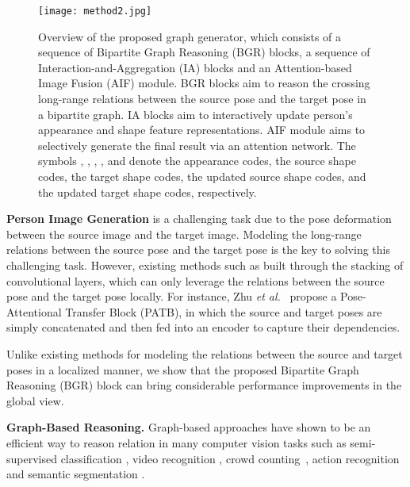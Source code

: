 \documentclass{bmvc2k}
\begin{document}
\begin{figure}[!t]
	\centering
\texttt{[image: method2.jpg]}
	\caption{Overview of the proposed graph generator, which consists of a sequence of Bipartite Graph Reasoning (BGR) blocks, a sequence of Interaction-and-Aggregation (IA) blocks and an Attention-based Image Fusion (AIF) module. BGR blocks aim to reason the crossing long-range relations between the source pose and the target pose in a bipartite graph. IA blocks aim to interactively update person's appearance and shape feature representations. AIF module aims to selectively generate the final result via an attention network.
	The symbols , , , , and  denote the appearance codes, the source shape codes, the target shape codes, the updated source shape codes, and the updated target shape codes, respectively.
	}
	\label{fig:method}
\end{figure}

\noindent \textbf{Person Image Generation} is a challenging task due to the pose deformation between the source image and the target image.
Modeling the long-range relations between the source pose and the target pose is the key to solving this challenging task.
However, existing methods such as \cite{ma2017pose,ma2018disentangled,balakrishnan2018synthesizing,siarohin2018deformable,tang2019cycle,albahar2019guided,esser2018variational,zhu2019progressive,chan2019everybody,zanfir2018human,liang2019pcgan,liu2019liquid} built through the stacking of convolutional layers, which can only leverage the relations between the source pose and the target pose locally.
For instance, Zhu \emph{et al.}~\cite{zhu2019progressive} propose a Pose-Attentional Transfer Block (PATB), in which the source and target poses are simply concatenated and then fed into an encoder to capture their dependencies.

Unlike existing methods for modeling the relations between the source and target poses in a localized manner, we show that the proposed Bipartite Graph Reasoning (BGR) block can bring considerable performance improvements in the global view.

\noindent \textbf{Graph-Based Reasoning.} Graph-based approaches have shown to be an efficient way to reason relation in many computer vision tasks such as semi-supervised classification \cite{kipf2017semi}, video recognition \cite{wang2018videos}, crowd counting~\cite{chen2020relevant}, action recognition \cite{yan2018spatial,peng2020mix} and semantic segmentation \cite{chen2019graph,zhang2019dual}.
\end{document}
